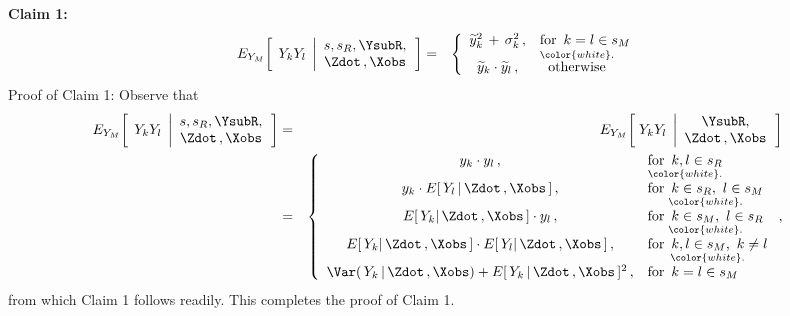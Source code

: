 \begin{enumerate}
    \vskip 0.5cm
    \textbf{Claim 1:}\quad
    \begin{eqnarray*}
    E_{Y_{M}}\!\left[\;\,
        Y_{k}Y_{l}
        \;\left\vert
        \begin{array}{c}
            s,s_{R},\YsubR, \\ \Zdot\,,\Xobs
            \end{array}
        \right.
        \right]
    & = &
        \left\{\begin{array}{cl}
            \widetilde{y}_{k}^{2} \,+\, \sigma_{k}^{2}\,, & \textnormal{for \,$k = l \in s_{M}$}
            \\
            \widetilde{y}_{k} \cdot \widetilde{y}_{l}\,, & \overset{{\color{white}.}}{\textnormal{otherwise}}
            \end{array}\right.
    \end{eqnarray*}
    Proof of Claim 1: Observe that
    \begin{eqnarray*}
        E_{Y_{M}}\!\left[\;\,
        Y_{k}Y_{l}
        \;\left\vert
        \begin{array}{c}
            s,s_{R},\YsubR, \\ \Zdot\,,\Xobs
            \end{array}
        \right.
        \right]
    & = &
        E_{Y_{M}}\!\left[\;
            Y_{k}Y_{l}
            \;\left\vert
            \begin{array}{c}
                \YsubR,
                \\
                \Zdot\,,\Xobs
                \end{array}
                \right.
            \right]
    \\
    & = &
        \left\{\begin{array}{cl}
            y_{k} \cdot y_{l}\,, & \underset{{\color{white}.}}{\textnormal{for \,$k,l \in s_{R}$}}
            \\
            y_{k} \cdot E[\,Y_{l}\,\vert\,\Zdot\,,\Xobs\,]\,, & \underset{{\color{white}.}}{\textnormal{for \,$k \in s_{R}$,\, $l \in s_{M}$}}
            \\
            E[\,Y_{k}\vert\,\Zdot\,,\Xobs\,] \cdot y_{l}\,, & \underset{{\color{white}.}}{\textnormal{for \,$k \in s_{M}$,\, $l \in s_{R}$}}
            \\
            E[\,Y_{k}\vert\,\Zdot\,,\Xobs\,] \cdot E[\,Y_{l}\vert\,\Zdot\,,\Xobs\,]\,, & \underset{{\color{white}.}}{\textnormal{for \,$k,l \in s_{M}$,\, $k \neq l$}}
            \\
            \Var(\,Y_{k}\,\vert\,\Zdot\,,\Xobs) + E[\,Y_{k}\,\vert\,\Zdot\,,\Xobs\,]^{2}\,, & \textnormal{for \,$k = l \in s_{M}$}
            \end{array}\right.,
    \end{eqnarray*}
    from which Claim 1 follows readily.
    This completes the proof of Claim 1.


\end{enumerate}
